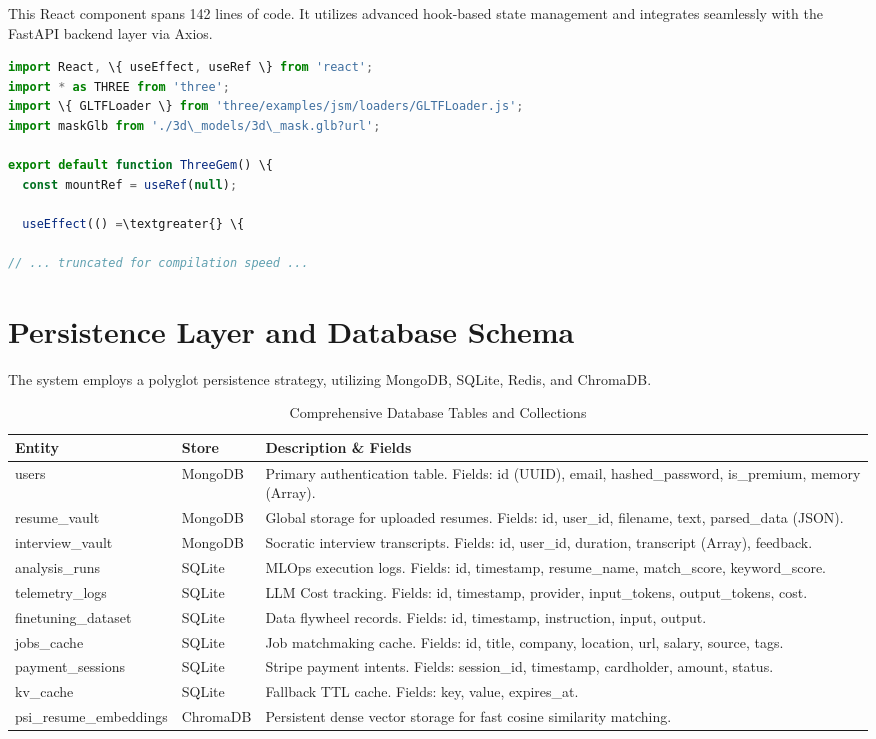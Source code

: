 \documentclass[10pt,journal,compsoc]{IEEEtran}
\begin{document}
This React component spans 142 lines of code. It utilizes advanced hook-based state management and integrates seamlessly with the FastAPI backend layer via Axios.

\begin{lstlisting}[language=JavaScript]
import React, \{ useEffect, useRef \} from 'react';
import * as THREE from 'three';
import \{ GLTFLoader \} from 'three/examples/jsm/loaders/GLTFLoader.js';
import maskGlb from './3d\_models/3d\_mask.glb?url';

export default function ThreeGem() \{
  const mountRef = useRef(null);

  useEffect(() =\textgreater{} \{
    
// ... truncated for compilation speed ...
\end{lstlisting}


\section{Persistence Layer and Database Schema}\label{sec:database}
The system employs a polyglot persistence strategy, utilizing MongoDB, SQLite, Redis, and ChromaDB.

\begin{table}[t]
\centering
\caption{Comprehensive Database Tables and Collections}
\begin{tabular}{p{3cm} p{2cm} p{10cm}}
\toprule
\textbf{Entity} & \textbf{Store} & \textbf{Description \& Fields} \\
\midrule
users & MongoDB & Primary authentication table. Fields: id (UUID), email, hashed\_password, is\_premium, memory (Array). \\
resume\_vault & MongoDB & Global storage for uploaded resumes. Fields: id, user\_id, filename, text, parsed\_data (JSON). \\
interview\_vault & MongoDB & Socratic interview transcripts. Fields: id, user\_id, duration, transcript (Array), feedback. \\
analysis\_runs & SQLite & MLOps execution logs. Fields: id, timestamp, resume\_name, match\_score, keyword\_score. \\
telemetry\_logs & SQLite & LLM Cost tracking. Fields: id, timestamp, provider, input\_tokens, output\_tokens, cost. \\
finetuning\_dataset & SQLite & Data flywheel records. Fields: id, timestamp, instruction, input, output. \\
jobs\_cache & SQLite & Job matchmaking cache. Fields: id, title, company, location, url, salary, source, tags. \\
payment\_sessions & SQLite & Stripe payment intents. Fields: session\_id, timestamp, cardholder, amount, status. \\
kv\_cache & SQLite & Fallback TTL cache. Fields: key, value, expires\_at. \\
psi\_resume\_embeddings & ChromaDB & Persistent dense vector storage for fast cosine similarity matching. \\
\bottomrule
\end{tabular}
\end{table}
\end{document}
